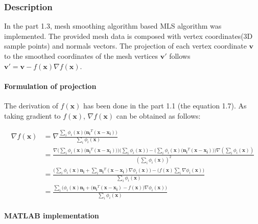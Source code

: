 \documentclass[paper=a4, fontsize=11pt]{scrartcl} %
\numberwithin{equation}{section} %
\numberwithin{figure}{section} %
\numberwithin{table}{section} %
\renewcommand{\vec}[1]{\mathbf{#1}}
\begin{document}
\subsubsection{Description}


In the part 1.3, mesh smoothing algorithm based MLS algorithm was implemented. The provided mesh data is composed with vertex coordinates(3D sample points) and normals vectors. The projection of each vertex coordinate $\vec{v}$ to the smoothed coordinates of the mesh vertices $\vec{v'}$ follows $\vec{v'} = \vec{v} - f(\vec{x}) \nabla f(\vec{x})$.

\paragraph{Formulation of projection}

The derivation of $f(\vec{x})$ has been done in the part 1.1 (the equation 1.7). As taking gradient to $f(\vec{x})$, $\nabla f(\vec{x})$ can be obtained as follows:

\begin{equation}
	\begin{split}
		\nabla f(\vec{x}) &= \nabla \frac{\sum_{i} \phi_i(\vec{x}) \big( \vec{n_i}^T(\vec{x} - \vec{x_i}) \big) }{\sum_{i} \phi_i(\vec{x})} 
		\\
		&= \frac{
		\nabla \Big( \sum_{i} \phi_i(\vec{x}) \big( \vec{n_i}^T(\vec{x} - \vec{x_i}) \big) \Big) 
			\big( \sum_{i} \phi_i(\vec{x}) \big) - 
		\Big( \sum_{i} \phi_i(\vec{x}) \big( \vec{n_i}^T(\vec{x} - \vec{x_i}) \big) \Big) \nabla (\sum_{i} \phi_i(\vec{x}))
		}
		{(\sum_{i} \phi_i(\vec{x}))^2}
		\\
		&= \frac{
		\Big( \sum_{i} \phi_i(\vec{x}) \vec{n_i} + \sum_{i} \vec{n_i}^T (\vec{x} - \vec{x_i}) \nabla \phi_i(\vec{x}) \Big) - 
		\big( f(\vec{x}) \sum_{i} \nabla \phi_i (\vec{x}) \big)
		}
		{\sum_{i} \phi_i(\vec{x})}
		\\
		&= \frac{
		\sum_{i} \Big( \phi_i(\vec{x}) \vec{n_i} + \big( \vec{n_i}^T (\vec{x} - \vec{x_i}) - f(\vec{x}) \big) \nabla \phi_i(\vec{x}) \Big)
		}
		{\sum_{i} \phi_i(\vec{x})}
	\end{split}
\end{equation}
	

\paragraph{MATLAB implementation}
\end{document}
